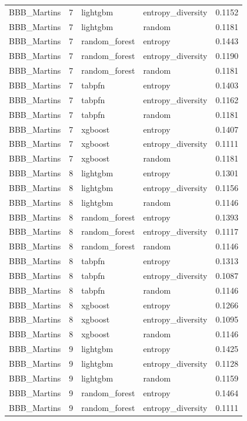 \begin{tabular}{lrllr}
BBB_Martins & 7 & lightgbm & entropy_diversity & 0.1152 \\
BBB_Martins & 7 & lightgbm & random & 0.1181 \\
BBB_Martins & 7 & random_forest & entropy & 0.1443 \\
BBB_Martins & 7 & random_forest & entropy_diversity & 0.1190 \\
BBB_Martins & 7 & random_forest & random & 0.1181 \\
BBB_Martins & 7 & tabpfn & entropy & 0.1403 \\
BBB_Martins & 7 & tabpfn & entropy_diversity & 0.1162 \\
BBB_Martins & 7 & tabpfn & random & 0.1181 \\
BBB_Martins & 7 & xgboost & entropy & 0.1407 \\
BBB_Martins & 7 & xgboost & entropy_diversity & 0.1111 \\
BBB_Martins & 7 & xgboost & random & 0.1181 \\
BBB_Martins & 8 & lightgbm & entropy & 0.1301 \\
BBB_Martins & 8 & lightgbm & entropy_diversity & 0.1156 \\
BBB_Martins & 8 & lightgbm & random & 0.1146 \\
BBB_Martins & 8 & random_forest & entropy & 0.1393 \\
BBB_Martins & 8 & random_forest & entropy_diversity & 0.1117 \\
BBB_Martins & 8 & random_forest & random & 0.1146 \\
BBB_Martins & 8 & tabpfn & entropy & 0.1313 \\
BBB_Martins & 8 & tabpfn & entropy_diversity & 0.1087 \\
BBB_Martins & 8 & tabpfn & random & 0.1146 \\
BBB_Martins & 8 & xgboost & entropy & 0.1266 \\
BBB_Martins & 8 & xgboost & entropy_diversity & 0.1095 \\
BBB_Martins & 8 & xgboost & random & 0.1146 \\
BBB_Martins & 9 & lightgbm & entropy & 0.1425 \\
BBB_Martins & 9 & lightgbm & entropy_diversity & 0.1128 \\
BBB_Martins & 9 & lightgbm & random & 0.1159 \\
BBB_Martins & 9 & random_forest & entropy & 0.1464 \\
BBB_Martins & 9 & random_forest & entropy_diversity & 0.1111 \\

\end{tabular}
